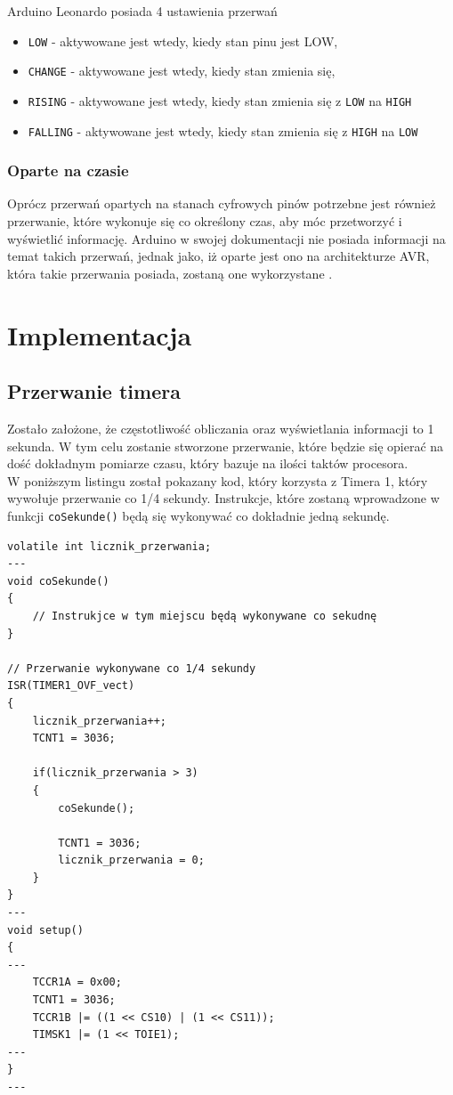 Arduino Leonardo posiada 4 ustawienia przerwań \cite{ard_ref}
\begin{itemize}
    \item \texttt{LOW} - aktywowane jest wtedy, kiedy stan pinu jest LOW,
    \item \texttt{CHANGE} - aktywowane jest wtedy, kiedy stan zmienia się,
    \item \texttt{RISING} - aktywowane jest wtedy, kiedy stan zmienia się z \texttt{LOW} na \texttt{HIGH} 
    \item \texttt{FALLING} - aktywowane jest wtedy, kiedy stan zmienia się z \texttt{HIGH} na \texttt{LOW} 
\end{itemize}

\subsubsection{Oparte na czasie}
Oprócz przerwań opartych na stanach cyfrowych pinów potrzebne jest również przerwanie, które wykonuje się co określony czas, aby móc przetworzyć i wyświetlić informację. Arduino w swojej dokumentacji nie posiada informacji na temat takich przerwań, jednak jako, iż oparte jest ono na architekturze AVR, która takie przerwania posiada, zostaną one wykorzystane \cite{atmega_datasheet}.\\

\section{Implementacja}
\subsection{Przerwanie timera} \label{setting_timer_interupt}

Zostało założone, że częstotliwość obliczania oraz wyświetlania informacji to 1 sekunda. W tym celu zostanie stworzone przerwanie, które będzie się opierać na dość dokładnym pomiarze czasu, który bazuje na ilości taktów procesora.\\

W poniższym listingu został pokazany kod, który korzysta z Timera 1, który wywołuje przerwanie co 1/4 sekundy. Instrukcje, które zostaną wprowadzone w funkcji \texttt{coSekunde()} będą się wykonywać co dokładnie jedną sekundę.

\begin{lstlisting}[label=list:timer_int,caption=Ustawianie przerwania timera,
basicstyle=\footnotesize\ttfamily]
volatile int licznik_przerwania;
---
void coSekunde()
{
    // Instrukjce w tym miejscu będą wykonywane co sekudnę
}

// Przerwanie wykonywane co 1/4 sekundy
ISR(TIMER1_OVF_vect)
{
    licznik_przerwania++;
    TCNT1 = 3036;
    
    if(licznik_przerwania > 3) 
    {
        coSekunde();

        TCNT1 = 3036;
        licznik_przerwania = 0;
    }
}
---
void setup()
{
---
    TCCR1A = 0x00;
    TCNT1 = 3036;
    TCCR1B |= ((1 << CS10) | (1 << CS11));
    TIMSK1 |= (1 << TOIE1);
---
}
---
\end{lstlisting}



